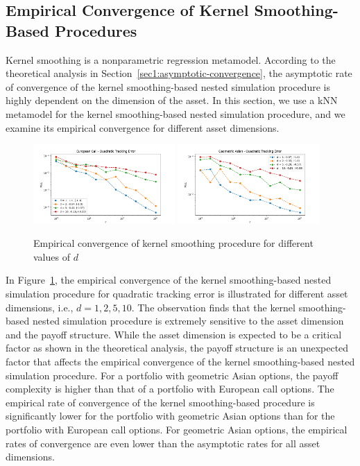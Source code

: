 \subsection{Empirical Convergence of Kernel Smoothing-Based Procedures} \label{sec1:kernel-smoothing-convergence}

Kernel smoothing is a nonparametric regression metamodel.
According to the theoretical analysis in Section~\ref{sec1:asymptotic-convergence}, the asymptotic rate of convergence of the kernel smoothing-based nested simulation procedure is highly dependent on the dimension of the asset.
In this section, we use a kNN metamodel for the kernel smoothing-based nested simulation procedure, and we examine its empirical convergence for different asset dimensions.

\begin{figure}[ht!]
    \centering
    \includegraphics[width=0.48\textwidth]{./project1/figures/figure4a.png}
    \includegraphics[width=0.48\textwidth]{./project1/figures/figure4b.png}
    \caption{Empirical convergence of kernel smoothing procedure for different values of $d$}
    \label{fig1:kernel_d} 
\end{figure}

In Figure~\ref{fig1:kernel_d}, the empirical convergence of the kernel smoothing-based nested simulation procedure for quadratic tracking error is illustrated for different asset dimensions, i.e., $d = 1, 2, 5, 10$.
The observation finds that the kernel smoothing-based nested simulation procedure is extremely sensitive to the asset dimension and the payoff structure.
While the asset dimension is expected to be a critical factor as shown in the theoretical analysis, the payoff structure is an unexpected factor that affects the empirical convergence of the kernel smoothing-based nested simulation procedure.
For a portfolio with geometric Asian options, the payoff complexity is higher than that of a portfolio with European call options.
The empirical rate of convergence of the kernel smoothing-based procedure is significantly lower for the portfolio with geometric Asian options than for the portfolio with European call options.
For geometric Asian options, the empirical rates of convergence are even lower than the asymptotic rates for all asset dimensions.

